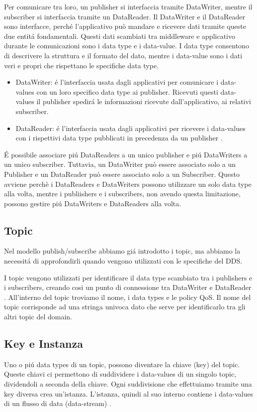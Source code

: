 Per comunicare tra loro, un publisher si interfaccia tramite
DataWriter, 
mentre il subscriber si interfaccia tramite un DataReader.
Il DataWriter e il DataReader sono interfacce, 
perché l'applicativo
può mandare e ricevere dati
tramite queste due entitá fondamentali. 
Questi dati scambiati tra middleware e applicativo durante le comunicazioni 
sono i data type e i data-value. I data type consentono di 
descrivere la struttura e il formato del dato, mentre i data-value
sono i dati veri e propri che rispettano le specifiche data type.
\begin{itemize}
    \item DataWriter: é l'interfaccia usata dagli applicativi 
    per comunicare i
    data-values con un loro specifico data type ai publisher.
    Ricevuti questi data-values il publisher spedirá le
    informazioni ricevute dall'applicativo, ai relativi subscriber.
    \item DataReader: é l'interfaccia usata dagli applicativi per
    ricevere i data-values con i rispettivi data type pubblicati in
    precedenza da un publisher \cite{dds1.4}.
\end{itemize}
É possibile
associare piú DataReaders a un unico publisher e piú DataWriters a 
un unico subscriber. Tuttavia, un DataWriter può essere associato solo a un 
Publisher e un DataReader può essere associato solo a un Subscriber. 
Questo avviene perchè
i DataReaders e DataWriters possono utilizzare un solo data type alla volta, 
mentre 
i publiishers e i subscribers, non avendo questa limitazione, possono gestire 
piú DataWriters e DataReaders alla volta.

\subsection{Topic}
Nel modello publish/subscribe abbiamo giá introdotto i topic, ma 
abbiamo la necessitá di approfondirli quando vengono utilizzati
con le specifiche del DDS.

I topic vengono utilizzati per identificare il data type
scambiato tra i publishers e i subscribers, creando cosi un punto
di connessione 
tra DataWriter e DataReader \cite{topicomg}.
All'interno del topic troviamo il nome,
i data types e le policy QoS.
Il nome del topic corrisponde ad una stringa univoca 
dato che serve per identificarlo 
tra gli altri topic del domain.


\subsection{Key e Instanza}
Uno o piú data types di un topic, possono diventare la chiave (key) del topic. 
Queste chiavi ci permettono di suddividere
i data-values di un singolo topic, dividendoli a seconda della chiave.
Ogni suddivisione che effettuiamo tramite una key diversa crea 
un'istanza. L'istanza, quindi al suo interno contiene i data-values di un 
flusso di data (data-stream)
\cite{Instance81:online}.

